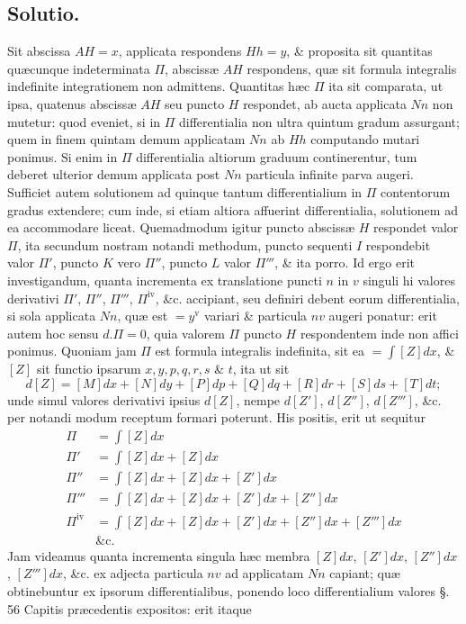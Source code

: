 \subsection*{Solutio.}
Sit abscissa $AH=x$, applicata respondens $Hh=y$, \& proposita sit quantitas quæcunque indeterminata $\Pi$, abscissæ $AH$ respondens, quæ sit formula integralis indefinite integrationem non admittens. Quantitas hæc $\Pi$ ita sit comparata, ut ipsa, quatenus abscissæ $AH$ seu puncto $H$ respondet, ab aucta applicata $Nn$ non mutetur: quod eveniet, si in $\Pi$ differentialia non ultra quintum gradum assurgant; quem in finem quintam demum applicatam $Nn$ ab $Hh$ computando mutari ponimus. Si enim in $\Pi$ differentialia altiorum graduum continerentur, tum deberet ulterior demum applicata post $Nn$ particula infinite parva augeri. Sufficiet autem solutionem ad quinque tantum differentialium in $\Pi$ contentorum gradus extendere; cum inde, si etiam altiora affuerint differentialia, solutionem ad ea accommodare liceat. Quemadmodum igitur puncto abscissæ $H$ respondet valor $\Pi$, ita secundum nostram notandi methodum, puncto sequenti $I$ respondebit valor $\Pi'$, puncto $K$ vero $\Pi''$, puncto $L$ valor $\Pi'''$, \& ita porro. Id ergo erit investigandum, quanta incrementa ex translatione puncti $n$ in $v$ singuli hi valores derivativi $\Pi'$, $\Pi''$, $\Pi'''$, $\Pi^{\mathrm{iv}}$, \&c. accipiant, seu definiri debent eorum differentialia, si sola applicata $Nn$, quæ est $=y^{\mathrm{v}}$ variari \& particula $nv$ augeri ponatur: erit autem hoc sensu $d.\Pi=0$, quia valorem $\Pi$ puncto $H$ respondentem inde non affici ponimus. Quoniam jam $\Pi$ est formula integralis indefinita, sit ea $=\int[Z]dx$, \& $[Z]$ sit functio ipsarum $x,y,p,q,r,s$ \& $t$, ita ut sit
\[d[Z]=[M]dx+[N]dy+[P]dp+[Q]dq+[R]dr+[S]ds+[T]dt;\]
unde simul valores derivativi ipsius $d[Z]$, nempe $d[Z']$, $d[Z'']$, $d[Z''']$, \&c. per notandi modum receptum formari poterunt. His positis, erit ut sequitur
\[\begin{aligned}
\Pi&=\int[Z]dx\\
\Pi'&=\int[Z]dx+[Z]dx\\
\Pi''&=\int[Z]dx+[Z]dx+[Z']dx\\
\Pi'''&=\int[Z]dx+[Z]dx+[Z']dx+[Z'']dx\\
\Pi^{\mathrm{iv}}&=\int[Z]dx+[Z]dx+[Z']dx+[Z'']dx+[Z''']dx\\&\text{\&c.}
\end{aligned}\]
Jam videamus quanta incrementa singula hæc membra $[Z]dx$, $[Z']dx$, $[Z'']dx$, $[Z''']dx$, \&c. ex adjecta particula $nv$ ad applicatam $Nn$ capiant; quæ obtinebuntur ex ipsorum differentialibus, ponendo loco differentialium valores §. 56 Capitis præcedentis expositos: erit itaque
